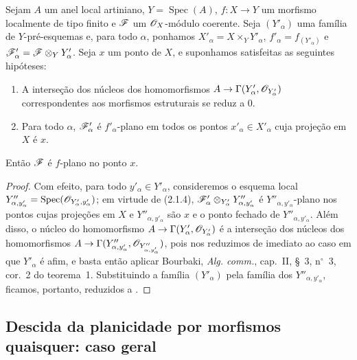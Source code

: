 \begin{corollary}[11.4.13]
\label{IV.11.4.13}
Sejam $A$ um anel local
artiniano,
$Y=\operatorname{Spec}(A)$,
$f:X\to Y$ um morfismo
localmente de tipo finito
e $\mathscr{F}$ um
$\mathscr{O}_X$-módulo coerente.
Seja $(Y'_\alpha)$ uma
família de
$Y$-pré-esquemas e, para
todo $\alpha$, ponhamos
$X'_\alpha=X\times_Y Y'_\alpha$,
$f'_\alpha=f_{(Y'_\alpha)}$
e $\mathscr{F}'_\alpha=
\mathscr{F}\otimes_Y Y'_\alpha$.
Seja $x$ um ponto de $X$,
e suponhamos satisfeitas
as seguintes hipóteses:
\begin{enumerate}[label=(\roman*)]
\item A interseção dos
núcleos dos homomorfismos
$A\to\Gamma(Y'_\alpha,
\sh{O}_{Y'_\alpha})$
correspondentes aos
morfismos estruturais se
reduz a $0$.
\item Para todo $\alpha$,
$\mathscr{F}'_\alpha$ é
$f'_\alpha$-plano em todos
os pontos
$x'_\alpha\in X'_\alpha$
cuja projeção em $X$ é
$x$.
\end{enumerate}
Então $\mathscr{F}$ é
$f$-plano no ponto $x$.
\end{corollary}

\begin{proof}
Com efeito, para todo
$y'_\alpha\in Y'_\alpha$,
consideremos o esquema
local
$Y''_{\alpha,y'_\alpha}=
\operatorname{Spec}(
\mathscr{O}_{Y'_\alpha,y'_\alpha})$;
em virtude de (2.1.4),
$\mathscr{F}'_\alpha
\otimes_{Y'_\alpha}
Y''_{\alpha,y'_\alpha}$
é $Y''_{\alpha,y'_\alpha}$-plano
nos pontos cujas projeções
em $X$ e
$Y''_{\alpha,y'_\alpha}$
são $x$ e o ponto fechado
de $Y''_{\alpha,y'_\alpha}$.
Além disso, o núcleo do
homomorfismo
$A\to\Gamma(Y'_\alpha,
\sh{O}_{Y'_\alpha})$ é a
interseção dos núcleos dos
homomorfismos
$A\to\Gamma(
Y''_{\alpha,y'_\alpha},
\sh{O}_{Y''_{\alpha,y'_\alpha}})$,
pois nos reduzimos de
imediato ao caso em que
$Y'_\alpha$ é afim, e
basta então aplicar
Bourbaki, \emph{Alg. comm.},
cap.~II, \S~3, n$^\circ$~3,
cor.~2 do teorema~1.
Substituindo a família
$(Y'_\alpha)$ pela família
dos $Y''_{\alpha,y'_\alpha}$,
ficamos, portanto, reduzidos
a .
\end{proof}

\subsection{Descida da planicidade por morfismos quaisquer: caso geral}
\label{subsection:IV.11.5}

